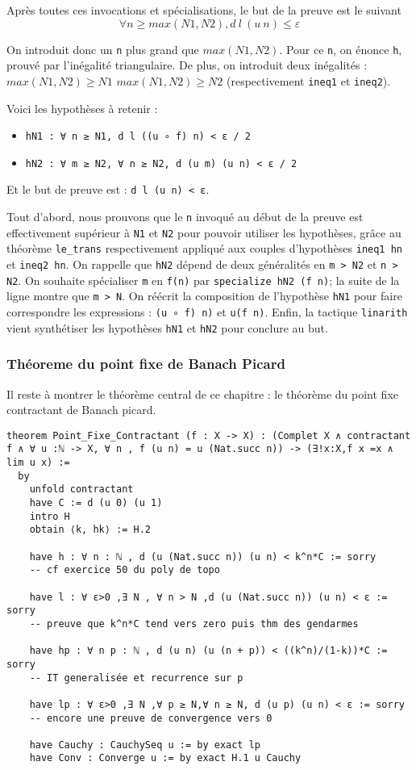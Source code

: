 \documentclass[a4paper, 12pt]{article}
\newcommand{\lean}[1]{\texttt{#1}}
\begin{document}
Après toutes ces invocations et spécialisations, le but de la preuve est le suivant $$\forall n \geq max (N1,N2), d\ l\ (u\ n) \leq \varepsilon$$

On introduit donc un \lean{n} plus grand que $max(N1,N2)$. Pour ce \lean{n}, on énonce \lean{h}, prouvé par l'inégalité triangulaire.
De plus, on introduit deux inégalités : $max(N1,N2) \geq N1$ $max(N1,N2) \geq N2$ (respectivement \lean{ineq1} et \lean{ineq2}).

Voici les hypothèses à retenir :
\begin{itemize}
    \item \lean{hN1 : ∀ n ≥ N1, d l ((u ∘ f) n) < ε / 2}
    \item \lean{hN2 : ∀ m ≥ N2, ∀ n ≥ N2, d (u m) (u n) < ε / 2}
\end{itemize}

Et le but de preuve est : \lean{d l (u n) < ε}.

Tout d'abord, nous prouvons que le \lean{n} invoqué au début de la preuve est effectivement supérieur à \lean{N1} et \lean{N2} pour pouvoir utiliser les hypothèses, grâce au théorème \lean{le_trans} respectivement appliqué aux couples d'hypothèses \lean{ineq1 hn} et \lean{ineq2 hn}. On rappelle que \lean{hN2} dépend de deux généralités en \lean{m > N2} et \lean{n > N2}. On souhaite spécialiser \lean{m} en \lean{f(n)} par \lean{specialize hN2 (f n)}; la suite de la ligne montre que \lean{m > N}.
On réécrit la composition de l'hypothèse \lean{hN1} pour faire correspondre les expressions : \lean{(u ∘ f) n)} et \lean{u(f n)}. Enfin, la tactique \lean{linarith} vient synthétiser les hypothèses \lean{hN1} et \lean{hN2} pour conclure au but.


\subsubsection{Théoreme du point fixe de Banach Picard}

Il reste à montrer le théorème central de ce chapitre : le théorème du point fixe contractant de Banach picard.

\begin{verbatim}
theorem Point_Fixe_Contractant (f : X -> X) : (Complet X ∧ contractant f ∧ ∀ u :ℕ -> X, ∀ n , f (u n) = u (Nat.succ n)) -> (∃!x:X,f x =x ∧ lim u x) :=
  by
    unfold contractant
    have C := d (u 0) (u 1)
    intro H
    obtain ⟨k, hk⟩ := H.2

    have h : ∀ n : ℕ , d (u (Nat.succ n)) (u n) < k^n*C := sorry
    -- cf exercice 50 du poly de topo

    have l : ∀ ε>0 ,∃ N , ∀ n > N ,d (u (Nat.succ n)) (u n) < ε := sorry
    -- preuve que k^n*C tend vers zero puis thm des gendarmes

    have hp : ∀ n p : ℕ , d (u n) (u (n + p)) < ((k^n)/(1-k))*C := sorry
    -- IT generalisée et recurrence sur p

    have lp : ∀ ε>0 ,∃ N ,∀ p ≥ N,∀ n ≥ N, d (u p) (u n) < ε := sorry
    -- encore une preuve de convergence vers 0

    have Cauchy : CauchySeq u := by exact lp
    have Conv : Converge u := by exact H.1 u Cauchy
\end{verbatim}
\end{document}
